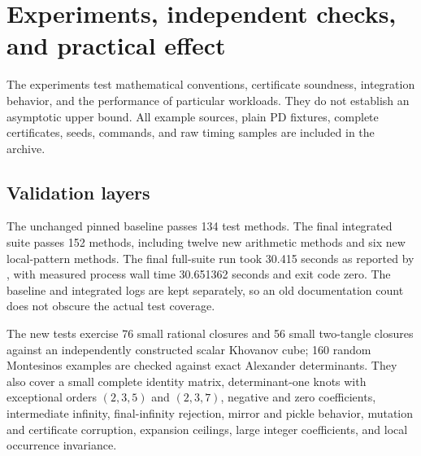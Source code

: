 \section{Experiments, independent checks, and practical effect}
\label{sec:experiments}

The experiments test mathematical conventions, certificate soundness,
integration behavior, and the performance of particular workloads.
They do not establish an asymptotic upper bound. All example sources,
plain PD fixtures, complete certificates, seeds, commands, and raw
timing samples are included in the archive.

\subsection{Validation layers}

The unchanged pinned baseline passes 134 test methods. The final integrated
suite passes 152 methods, including twelve new arithmetic methods and
six new local-pattern methods. The final full-suite run took 30.415 seconds
as reported by , with measured process wall time
30.651362 seconds and exit code zero. The baseline and integrated logs
are kept separately, so an old documentation count does not obscure the
actual test coverage.

The new tests exercise 76 small rational closures and 56 small two-tangle
closures against an independently constructed scalar Khovanov cube;
160 random Montesinos examples are checked against exact Alexander
determinants. They also cover a small complete identity matrix,
determinant-one knots with exceptional orders \((2,3,5)\) and
\((2,3,7)\), negative and zero coefficients, intermediate infinity,
final-infinity rejection, mirror and pickle behavior, mutation and
certificate corruption, expansion ceilings, large integer coefficients,
and local occurrence invariance.

